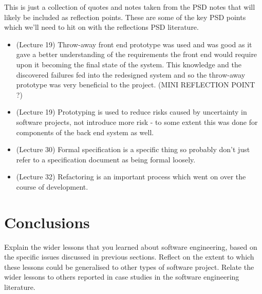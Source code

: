 \documentclass{l3proj}
\begin{document}
This is just a collection of quotes and notes taken from the PSD notes that will likely be included as reflection points. These are some of the key PSD points which we'll need to hit on with the reflections PSD literature.
\begin{itemize}
\item (Lecture 19) Throw-away front end prototype was used and was good as it gave a better understanding of the requirements the front end would require upon it becoming the final state of the system. This knowledge and the discovered failures fed into the redesigned system and so the throw-away prototype was very beneficial to the project. (MINI REFLECTION POINT ?)
\item (Lecture 19) Prototyping is used to reduce risks caused by uncertainty in software projects, not introduce more risk - to some extent this was done for components of the back end system as well.
\item (Lecture 30) Formal specification is a specific thing so probably don't just refer to a specification document as being formal loosely.
\item (Lecture 32) Refactoring is an important process which went on over the course of development.
\end{itemize}


\section{Conclusions}
\label{sec:conclusions}


Explain the wider lessons that you learned about software engineering,
based on the specific issues discussed in previous sections.  Reflect
on the extent to which these lessons could be generalised to other
types of software project.  Relate the wider lessons to others
reported in case studies in the software engineering literature.



\end{document}
